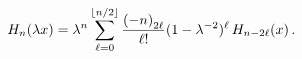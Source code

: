 \[\mathop{H_{n}\/}\nolimits\!\left(\lambda x\right)=\lambda^{n}\sum_{\ell=0}^{%
\left\lfloor n/2\right\rfloor}\frac{\left(-n\right)_{2\ell}}{\ell!}(1-\lambda^%
{-2})^{\ell}\mathop{H_{n-2\ell}\/}\nolimits\!\left(x\right).\]